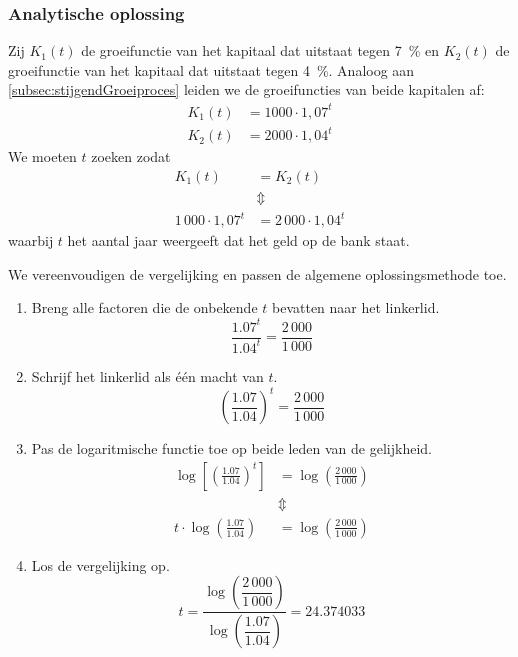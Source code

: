 \subsubsection{Analytische oplossing}
Zij $K_1(t)$ de groeifunctie van het kapitaal dat uitstaat tegen \SI{7}{\percent} en $K_2(t)$ de groeifunctie van het kapitaal dat uitstaat tegen \SI{4}{\percent}. Analoog aan \cref{subsec:stijgendGroeiproces} leiden we de groeifuncties van beide kapitalen af:
\begin{equation}
\begin{split}
K_1(t)&=1000\cdot 1,07^t\\
K_2(t)&=2000\cdot 1,04^t
\end{split}
\end{equation}
We moeten $t$ zoeken zodat 
\begin{equation}
\begin{split}
K_1(t)&=K_2(t)   \\
&\Updownarrow\\
1\,000\cdot 1,07^t&=2\,000\cdot 1,04^t
\end{split}
\label{exp_vgl:vb2}
\end{equation} 
waarbij $t$ het aantal jaar weergeeft dat het geld op de bank staat.

We vereenvoudigen de vergelijking en passen de algemene
oplossingsmethode toe. 

\begin{enumerate}
\item Breng alle factoren die de onbekende $t$ bevatten naar het linkerlid.
\[
    \frac{\num{1.07}^t}{\num{1.04}^{t}}=\frac{2\,000}{1\,000}
\]
\item Schrijf het linkerlid als \'e\'en macht van $t$.
\[
\left(\frac{\num{1.07}}{\num{1.04}}\right)^{t}=\frac{2\,000}{1\,000}
\]
\item Pas de logaritmische functie toe op beide leden van de gelijkheid.
\begin{align*}
\log\left[\left(\frac{\num{1.07}}{\num{1.04}}\right)^{t}\right]&= \log\left(\frac{2\,000}{1\,000}\right)\\
     &\Updownarrow  \\
t\cdot \log\left(\frac{\num{1.07}}{\num{1.04}}\right)&= \log\left(\frac{2\,000}{1\,000}\right)
\end{align*}
\item Los de vergelijking op.
\[
t=\frac{\log\left(\dfrac{2\,000}{1\,000}\right)}{\log\left(\dfrac{\num{1.07}}{\num{1.04}}\right)}=\num{24.374033}
\]
\end{enumerate}


